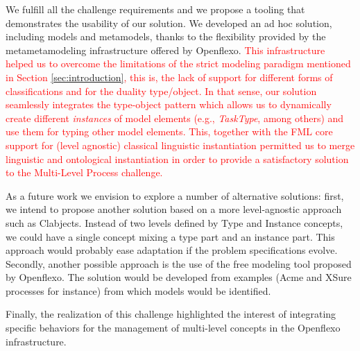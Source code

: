 

We fulfill all the challenge requirements and we propose a tooling that
demonstrates the usability of our solution. We developed an ad hoc solution,
including models and metamodels, thanks to the flexibility provided by the
metametamodeling infrastructure offered by Openflexo. \textcolor{red}{This infrastructure helped us to overcome the limitations of the strict modeling paradigm mentioned in Section \ref{sec:introduction}, this is, the lack of support for different forms of classifications and for the duality type/object. In that sense, our solution seamlessly integrates the type-object pattern which allows us to dynamically create different \emph{instances} of model elements (e.g., \emph{TaskType}, among others) and use them for typing other model elements. This, together with the FML core support for (level agnostic) classical linguistic instantiation permitted us to merge linguistic and ontological instantiation in order to provide a satisfactory solution to the Multi-Level Process challenge.}

As a future work we envision to explore a number of alternative solutions:
first, we intend to propose another solution based on a more level-agnostic
approach such as Clabjects. Instead of two levels defined by Type and Instance
concepts, we could have a single concept mixing a type part and an instance
part. This approach would probably ease adaptation if the problem
specifications evolve. Secondly, another possible approach is the use of the
free modeling tool proposed by Openflexo. The solution would be developed from
examples (Acme and XSure processes for instance) from which models would be
identified. 

Finally, the realization of this challenge highlighted the interest
of integrating specific behaviors for the management of multi-level concepts in
the Openflexo infrastructure. %
